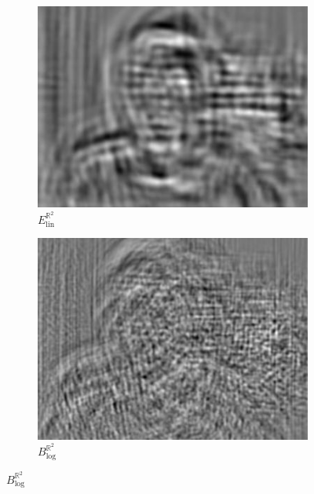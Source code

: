 \documentclass{article}
\begin{document}
\begin{figure}[h!]
\begin{subfigure}[b]{0.1\textwidth}
        \label{fig:mean and std of net44}
    \end{subfigure}
    \hspace{-1\baselineskip}
    \quad
    \begin{subfigure}[b]{0.1\textwidth}   
        \centering 
        \includegraphics[width=\textwidth]{plots/E_lin_R2_conv.jpg}
        \caption{$E_{\text{lin}}^{\mathbb{R}^2}$}%
        
        \label{fig:mean and std of net44}
    \end{subfigure}
    \hspace{-1\baselineskip}
    \quad
    \begin{subfigure}[b]{0.1\textwidth}   
        \centering 
        \includegraphics[width=\textwidth]{plots/B_log_R2_conv.jpg}
        \caption{$B_{\text{log}}^{\mathbb{R}^2}$}%
        

\end{subfigure}
\end{figure}
\end{document}

